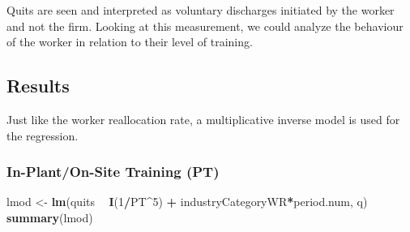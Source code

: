 \documentclass[
]{article}
\newenvironment{Shaded}{\begin{snugshade}}{\end{snugshade}}
\newcommand{\DecValTok}[1]{\textcolor[rgb]{0.00,0.00,0.81}{#1}}
\newcommand{\KeywordTok}[1]{\textcolor[rgb]{0.13,0.29,0.53}{\textbf{#1}}}
\newcommand{\NormalTok}[1]{#1}
\newcommand{\OperatorTok}[1]{\textcolor[rgb]{0.81,0.36,0.00}{\textbf{#1}}}
\newcommand{\StringTok}[1]{\textcolor[rgb]{0.31,0.60,0.02}{#1}}
\begin{document}
Quits are seen and interpreted as voluntary discharges initiated by the
worker and not the firm. Looking at this measurement, we could analyze
the behaviour of the worker in relation to their level of training.

\hypertarget{results-2}{%
\subsection{Results}\label{results-2}}

Just like the worker reallocation rate, a multiplicative inverse model
is used for the regression.

\hypertarget{in-planton-site-training-pt-2}{%
\subsubsection{In-Plant/On-Site Training
(PT)}\label{in-planton-site-training-pt-2}}

\begin{Shaded}
\begin{Highlighting}[]
\NormalTok{lmod <-}\StringTok{ }\KeywordTok{lm}\NormalTok{(quits }\OperatorTok{~}\StringTok{ }\KeywordTok{I}\NormalTok{(}\DecValTok{1}\OperatorTok{/}\NormalTok{PT}\OperatorTok{^}\DecValTok{5}\NormalTok{) }\OperatorTok{+}\StringTok{ }\NormalTok{industryCategoryWR}\OperatorTok{*}\NormalTok{period.num, q)}
\KeywordTok{summary}\NormalTok{(lmod)}
\end{Highlighting}
\end{Shaded}
\end{document}
